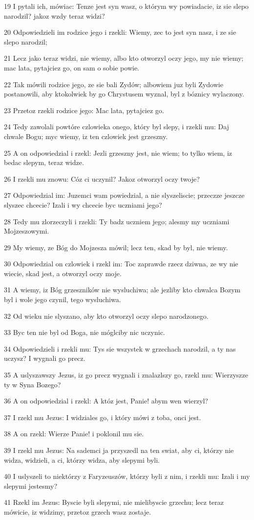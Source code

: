 \par 19 I pytali ich, mówiac: Tenze jest syn wasz, o którym wy powiadacie, iz sie slepo narodzil? jakoz wzdy teraz widzi?
\par 20 Odpowiedzieli im rodzice jego i rzekli: Wiemy, zec to jest syn nasz, i ze sie slepo narodzil;
\par 21 Lecz jako teraz widzi, nie wiemy, albo kto otworzyl oczy jego, my nie wiemy; mac lata, pytajciez go, on sam o sobie powie.
\par 22 Tak mówili rodzice jego, ze sie bali Zydów; albowiem juz byli Zydowie postanowili, aby ktokolwiek by go Chrystusem wyznal, byl z bóznicy wylaczony.
\par 23 Przetoz rzekli rodzice jego: Mac lata, pytajciez go.
\par 24 Tedy zawolali powtóre czlowieka onego, który byl slepy, i rzekli mu: Daj chwale Bogu; myc wiemy, iz ten czlowiek jest grzeszny.
\par 25 A on odpowiedzial i rzekl: Jezli grzeszny jest, nie wiem; to tylko wiem, iz bedac slepym, teraz widze.
\par 26 I rzekli mu znowu: Cóz ci uczynil? Jakoz otworzyl oczy twoje?
\par 27 Odpowiedzial im: Juzemci wam powiedzial, a nie slyszeliscie; przeczze jeszcze slyszec chcecie? Izali i wy chcecie byc uczniami jego?
\par 28 Tedy mu zlorzeczyli i rzekli: Ty badz uczniem jego; alesmy my uczniami Mojzeszowymi.
\par 29 My wiemy, ze Bóg do Mojzesza mówil; lecz ten, skad by byl, nie wiemy.
\par 30 Odpowiedzial on czlowiek i rzekl im: Toc zaprawde rzecz dziwna, ze wy nie wiecie, skad jest, a otworzyl oczy moje.
\par 31 A wiemy, iz Bóg grzeszników nie wysluchiwa; ale jezliby kto chwalca Bozym byl i wole jego czynil, tego wysluchiwa.
\par 32 Od wieku nie slyszano, aby kto otworzyl oczy slepo narodzonego.
\par 33 Byc ten nie byl od Boga, nie móglciby nic uczynic.
\par 34 Odpowiedzieli i rzekli mu: Tys sie wszystek w grzechach narodzil, a ty nas uczysz? I wygnali go precz.
\par 35 A uslyszawszy Jezus, iz go precz wygnali i znalazlszy go, rzekl mu: Wierzyszze ty w Syna Bozego?
\par 36 A on odpowiedzial i rzekl: A któz jest, Panie! abym wen wierzyl?
\par 37 I rzekl mu Jezus: I widziales go, i który mówi z toba, onci jest.
\par 38 A on rzekl: Wierze Panie! i poklonil mu sie.
\par 39 I rzekl mu Jezus: Na sademci ja przyszedl na ten swiat, aby ci, którzy nie widza, widzieli, a ci, którzy widza, aby slepymi byli.
\par 40 I uslyszeli to niektórzy z Faryzeuszów, którzy byli z nim, i rzekli mu: Izali i my slepymi jestesmy?
\par 41 Rzekl im Jezus: Byscie byli slepymi, nie mielibyscie grzechu; lecz teraz mówicie, iz widzimy, przetoz grzech wasz zostaje.

